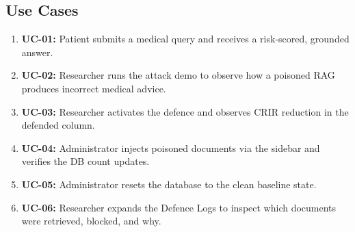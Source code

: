 \subsection{Use Cases}
\begin{enumerate}
    \item \textbf{UC-01:} Patient submits a medical query and receives a risk-scored,
          grounded answer.
    \item \textbf{UC-02:} Researcher runs the attack demo to observe how a poisoned RAG
          produces incorrect medical advice.
    \item \textbf{UC-03:} Researcher activates the defence and observes CRIR reduction in
          the defended column.
    \item \textbf{UC-04:} Administrator injects poisoned documents via the sidebar and
          verifies the DB count updates.
    \item \textbf{UC-05:} Administrator resets the database to the clean baseline state.
    \item \textbf{UC-06:} Researcher expands the Defence Logs to inspect which documents
          were retrieved, blocked, and why.
\end{enumerate}
